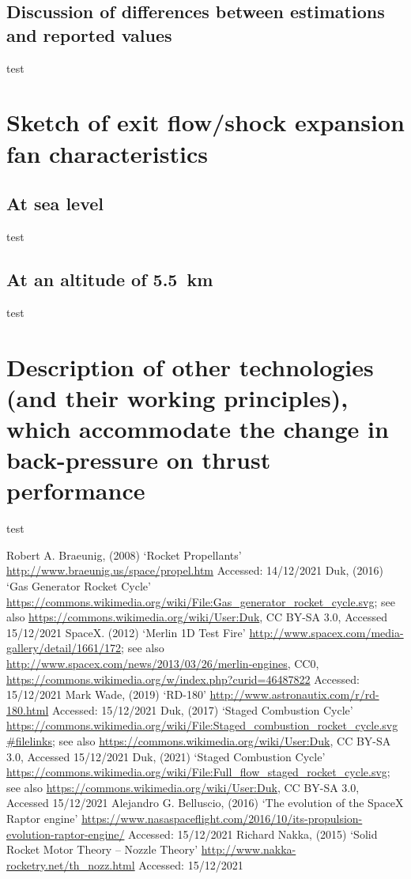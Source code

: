 \documentclass[11pt]{article}
\numberwithin{equation}{section}
\begin{document}
\subsection{Discussion of differences between estimations and reported values}
test
\section{Sketch of exit flow/shock expansion fan characteristics}
\subsection{At sea level}
test
\subsection{At an altitude of \SI{5.5}{\kilo\meter}}
test
\section{Description of other technologies (and their working principles), which accommodate the change in back-pressure on thrust performance}
test
\begin{thebibliography}{00}
     Robert A. Braeunig, (2008) `Rocket Propellants' \url{http://www.braeunig.us/space/propel.htm} Accessed: 14/12/2021
     Duk, (2016) `Gas Generator Rocket Cycle' \url{https://commons.wikimedia.org/wiki/File:Gas_generator_rocket_cycle.svg}; see also \url{https://commons.wikimedia.org/wiki/User:Duk}, CC BY-SA 3.0, Accessed 15/12/2021
     SpaceX. (2012) `Merlin 1D Test Fire' \url{http://www.spacex.com/media-gallery/detail/1661/172}; see also \url{http://www.spacex.com/news/2013/03/26/merlin-engines}, CC0, \url{https://commons.wikimedia.org/w/index.php?curid=46487822} Accessed: 15/12/2021
     Mark Wade, (2019) `RD-180' \url{http://www.astronautix.com/r/rd-180.html} Accessed: 15/12/2021
     Duk, (2017) `Staged Combustion Cycle' \url{https://commons.wikimedia.org/wiki/File:Staged_combustion_rocket_cycle.svg#filelinks}; see also \url{https://commons.wikimedia.org/wiki/User:Duk}, CC BY-SA 3.0, Accessed 15/12/2021
     Duk, (2021) `Staged Combustion Cycle' \url{https://commons.wikimedia.org/wiki/File:Full_flow_staged_rocket_cycle.svg}; see also \url{https://commons.wikimedia.org/wiki/User:Duk}, CC BY-SA 3.0, Accessed 15/12/2021
     Alejandro G. Belluscio, (2016) `The evolution of the SpaceX Raptor engine' \url{https://www.nasaspaceflight.com/2016/10/its-propulsion-evolution-raptor-engine/} Accessed: 15/12/2021
     Richard Nakka, (2015) `Solid Rocket Motor Theory -- Nozzle Theory' \url{http://www.nakka-rocketry.net/th_nozz.html} Accessed: 15/12/2021
\end{thebibliography}
\end{document}
